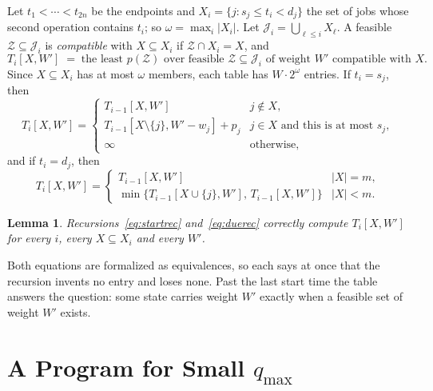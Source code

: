 \documentclass[11pt,a4paper]{article}
\newtheorem{lemma}{Lemma}
\theoremstyle{definition}
\theoremstyle{plain}
\newcommand{\qmax}{q_{\max}}
\newcommand{\calJ}{\mathcal{J}}
\newcommand{\calZ}{\mathcal{Z}}
\begin{document}
Let $t_1<\cdots<t_{2n}$ be the endpoints and $X_i=\{j: s_j\le t_i<d_j\}$ the set of jobs whose
second operation contains $t_i$; so $\omega=\max_i|X_i|$. Let $\calJ_i=\bigcup_{\ell\le i}X_\ell$.
A feasible $\calZ\subseteq\calJ_i$ is \emph{compatible} with $X\subseteq X_i$ if
$\calZ\cap X_i=X$, and
\[
T_i[X,W']\;=\;\text{the least }p(\calZ)\text{ over feasible }\calZ\subseteq\calJ_i
\text{ of weight }W'\text{ compatible with }X.
\]
Since $X\subseteq X_i$ has at most $\omega$ members, each table has $W\cdot2^{\omega}$ entries.
If $t_i=s_j$, then
\begin{equation}\label{eq:startrec}
T_i[X,W']=\begin{cases}
T_{i-1}[X,W'] & j\notin X,\\
T_{i-1}[X\setminus\{j\},W'-w_j]+p_j & j\in X\text{ and this is at most }s_j,\\
\infty & \text{otherwise,}
\end{cases}
\end{equation}
and if $t_i=d_j$, then
\begin{equation}\label{eq:duerec}
T_i[X,W']=\begin{cases}
T_{i-1}[X,W'] & |X|=m,\\
\min\{T_{i-1}[X\cup\{j\},W'],\,T_{i-1}[X,W']\} & |X|<m.
\end{cases}
\end{equation}

\begin{lemma}\label{lem:2^w}
Recursions~\eqref{eq:startrec} and~\eqref{eq:duerec} correctly compute $T_i[X,W']$ for every
$i$, every $X\subseteq X_i$ and every $W'$.
\end{lemma}
Both equations are formalized as equivalences, so each says at once that the recursion invents
no entry and loses none. Past the last start time the table answers the question: some state
carries weight $W'$ exactly when a feasible set of weight $W'$ exists.

\section{A Program for Small $\qmax$}\label{sec:smallq}
\end{document}

